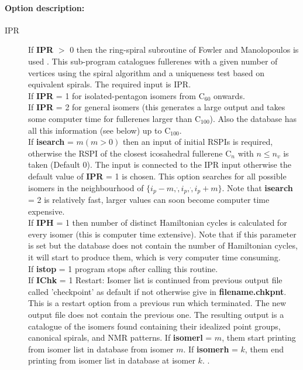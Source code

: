 \documentclass[article,a4paper,twoside]{memoir}
\newcommand{\C}[1]{\ensuremath{\mathrm{C}_{#1}}}
\newcommand{\paramname}[1]{{\color{green}\textbf{#1}}}
\begin{document}
\paragraph{Option description:}
\begin{description}
\item[IPR] 
If \paramname{IPR} $>$ 0 then the ring-spiral subroutine of Fowler and Manolopoulos is used \cite{Atlas}.
This sub-program catalogues fullerenes with a given number of vertices using the spiral algorithm and a uniqueness test
based on equivalent spirals. The required input is IPR.\\
If \paramname{IPR} = 1 for isolated-pentagon isomers from \C{60} onwards.\\
If \paramname{IPR} = 2 for general isomers (this generates a large output and takes some computer time for fullerenes larger than \C{100}).
Also the database has all this information (see below) up to \C{100}.\\
If \paramname{isearch} = $m (m > 0)$ then an input of initial RSPIs is required, otherwise the RSPI of the closest icosahedral fullerene \C{n} with $n \leq n_v$
is taken (Default 0). The input is connected to the IPR input otherwise the default value of  \paramname{IPR} = 1 is chosen. This option searches for all
possible isomers in the neighbourhood of $ \{ i_p - m, \dot ,i_p, \dot , i_p + m \} $. Note that \paramname{isearch} = 2 is relatively fast, larger values can soon
become computer time expensive.\\
If \paramname{IPH} = 1 then number of distinct Hamiltonian cycles is calculated for every isomer (this is computer time extensive). Note that if this parameter is set but the database does not contain the number of Hamiltonian cycles, it will start to produce them, which is very computer time consuming.\\
If \paramname{istop} = 1 program stops after calling this routine.\\
If \paramname{IChk} = 1  Restart: Isomer list is continued from previous output file called 'checkpoint' as default if not otherwise give in \paramname{filename.chkpnt}.
This is a restart option from a previous run which terminated. The new output file does not contain the previous one.
The resulting output is a catalogue of the isomers found containing their idealized point groups, canonical spirals, and NMR patterns.
If \paramname{isomerl} = $m$, them start printing from isomer list in database from isomer $m$.
If \paramname{isomerh} = $k$, them end printing from isomer list in database at isomer $k$. 
\cite{Atlas}.
\end{description}
\end{document}
